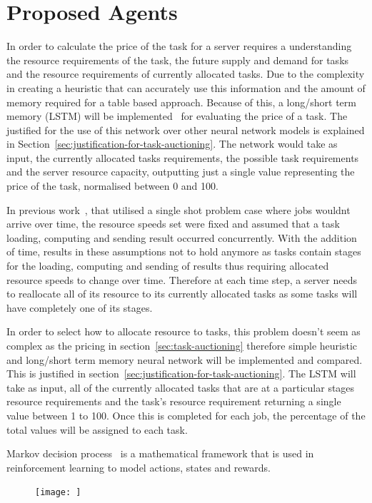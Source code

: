 \section{Proposed Agents}\label{sec:proposed-agents}

In order to calculate the price of the task for a server requires a understanding the resource requirements of the task,
the future supply and demand for tasks and the resource requirements of currently allocated tasks. Due to the complexity
in creating a heuristic that can accurately use this information and the amount of memory required for a table based
approach. Because of this, a long/short term memory (LSTM) will be implemented~\citep{LSTM}  for evaluating the price
of a task. The justified for the use of this network over other neural network models is explained in
Section~\ref{sec:justification-for-task-auctioning}. The network would take as input, the currently
allocated tasks requirements, the possible task requirements and the server resource capacity, outputting just a single
value representing the price of the task, normalised between 0 and 100.

In previous work~\citep{FlexibleResourceAllocation}, that utilised a single shot problem case where jobs wouldnt arrive
over time, the resource speeds set were fixed and assumed that a task loading, computing and sending result
occurred concurrently. With the addition of time, results in these assumptions not to hold anymore as tasks contain
stages for the loading, computing and sending of results thus requiring allocated resource speeds to change over time.
Therefore at each time step, a server needs to reallocate all of its resource to its currently allocated tasks as
some tasks will have completely one of its stages.

In order to select how to allocate resource to tasks, this problem doesn't seem as complex as the pricing in
section~\ref{sec:task-auctioning} therefore simple heuristic and long/short term memory neural network will be
implemented and compared. This is justified in section~\ref{sec:justification-for-task-auctioning}. The LSTM will take as input, all of
the currently allocated tasks that are at a particular stages resource requirements and the task's resource requirement
returning a single value between 1 to 100. Once this is completed for each job, the percentage of the total values will
be assigned to each task.

Markov decision process~\citep{} is a mathematical framework that is used in reinforcement learning to model actions,
states and rewards.
\begin{figure}
    \texttt{[image: ]}
    \caption{}
    \label{fig:mdp}
\end{figure}


